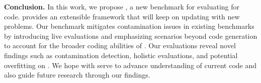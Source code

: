 \textbf{Conclusion.} In this work, we propose \livecodebench{}, a new benchmark for evaluating \llms{} for code.
\livecodebench{} provides an extensible framework that will keep on updating with new problems.
Our benchmark mitigates contamination issues in existing benchmarks by introducing live evaluations and emphasizing scenarios beyond code generation to account for the broader coding abilities of \llms{}.
Our evaluations reveal novel findings such as contamination detection, holistic evaluations, and potential overfitting on \humaneval{}.
We hope \livecodebench{} with serve to advance understanding of current code \llms{} and also guide future research through our findings.
